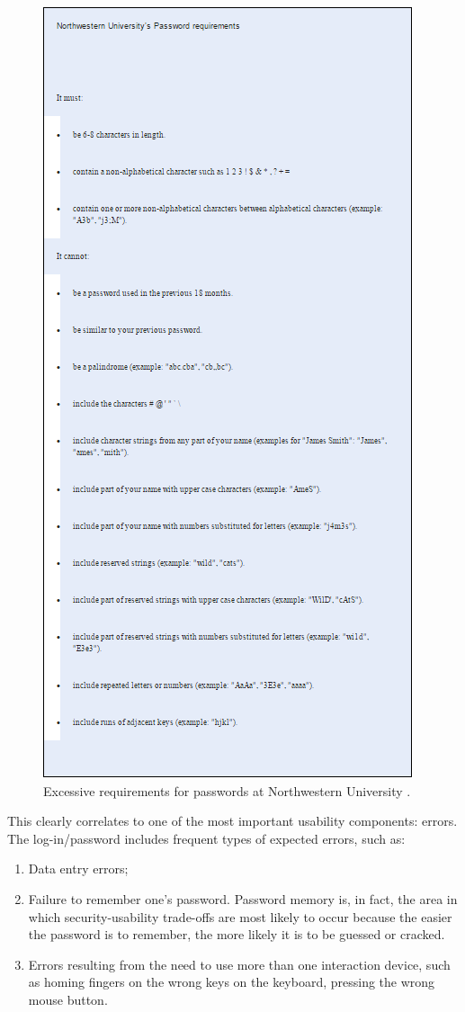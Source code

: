 \documentclass{article}
\begin{document}
\begin{figure}
  \centering
    \includegraphics[scale=0.8]{northwestern_password_requirements}
     \caption{Excessive requirements for passwords at Northwestern University \cite{norman2009way}.}
\end{figure}

This clearly correlates to one of the most important usability components: errors.  The log-in/password includes frequent types of expected errors, such as:
\begin{enumerate}
\item Data entry errors;
\item Failure to remember one's password. Password memory is, in fact, the area in which security-usability trade-offs are most likely to occur because the easier the password is to remember, the more likely it is to be guessed or cracked. 
\item Errors resulting from the need to use more than one interaction device, such as homing fingers on the wrong keys on the keyboard, pressing the wrong mouse button. 
\end{enumerate}
\end{document}
